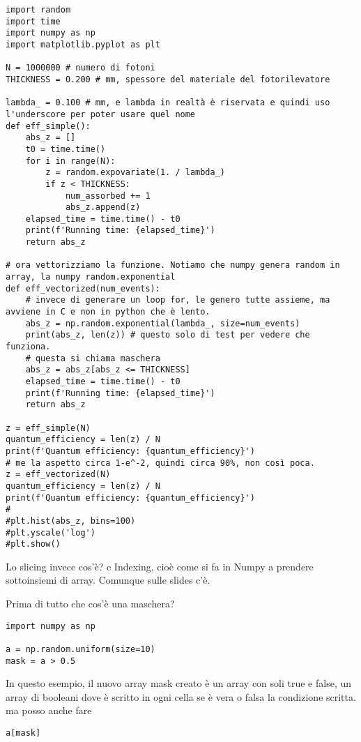 \documentclass[10pt, a4paper, titlepage]{book}
\begin{document}
\begin{verbatim}
import random
import time
import numpy as np
import matplotlib.pyplot as plt

N = 1000000 # numero di fotoni
THICKNESS = 0.200 # mm, spessore del materiale del fotorilevatore

lambda_ = 0.100 # mm, e lambda in realtà è riservata e quindi uso l'underscore per poter usare quel nome
def eff_simple():
	abs_z = []
	t0 = time.time()
	for i in range(N):
		z = random.expovariate(1. / lambda_)
		if z < THICKNESS:
			num_assorbed += 1
			abs_z.append(z)
	elapsed_time = time.time() - t0
	print(f'Running time: {elapsed_time}')
	return abs_z

# ora vettorizziamo la funzione. Notiamo che numpy genera random in array, la numpy random.exponential
def eff_vectorized(num_events):
	# invece di generare un loop for, le genero tutte assieme, ma avviene in C e non in python che è lento.
	abs_z = np.random.exponential(lambda_, size=num_events)
	print(abs_z, len(z)) # questo solo di test per vedere che funziona.
	# questa si chiama maschera
	abs_z = abs_z[abs_z <= THICKNESS]
	elapsed_time = time.time() - t0
	print(f'Running time: {elapsed_time}')
	return abs_z

z = eff_simple(N)
quantum_efficiency = len(z) / N
print(f'Quantum efficiency: {quantum_efficiency}')
# me la aspetto circa 1-e^-2, quindi circa 90%, non così poca.
z = eff_vectorized(N)
quantum_efficiency = len(z) / N
print(f'Quantum efficiency: {quantum_efficiency}')
#
#plt.hist(abs_z, bins=100)
#plt.yscale('log')
#plt.show()
\end{verbatim}

Lo slicing invece cos'è? e Indexing, cioè come si fa in Numpy a prendere sottoinsiemi di array. Comunque sulle slides c'è.

Prima di tutto che cos'è una maschera? 

\begin{verbatim}
import numpy as np

a = np.random.uniform(size=10)
mask = a > 0.5
\end{verbatim}

In questo esempio, il nuovo array mask creato è un array con soli true e false, un array di booleani dove è scritto in ogni cella se è vera o falsa la condizione scritta.
ma posso anche fare

\begin{verbatim}
a[mask]
\end{verbatim}
\end{document}
